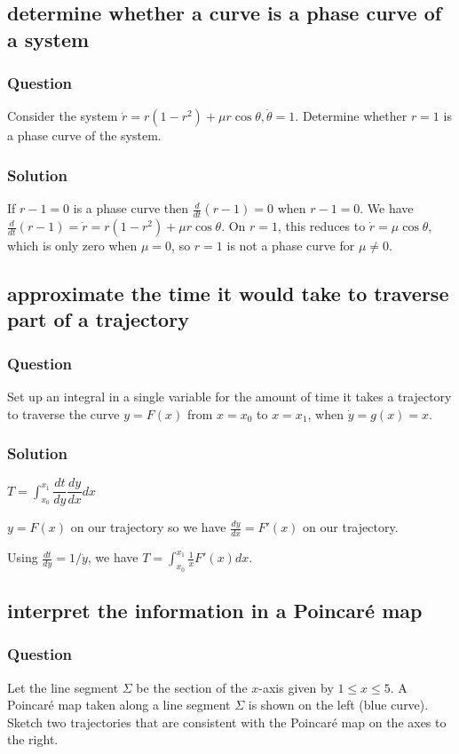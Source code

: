 \documentclass[12pt,letterpaper,noanswers]{exam}
\begin{document}
\subsection{determine whether a curve is a phase curve of a system}
\subsubsection{Question}
Consider the system $\dot r = r(1-r^2)+\mu r\cos\theta, \dot\theta = 1$.  Determine whether $r = 1$ is a phase curve of the system.

\subsubsection{Solution}
If $r-1 = 0$ is a phase curve then $\frac{d}{dt}(r-1) = 0$ when $r-1 = 0$.  We have $\frac{d}{dt}(r-1) = \dot r = r(1-r^2)+\mu r\cos\theta$.  On $r = 1$, this reduces to $\dot r = \mu\cos\theta$, which is only zero when $\mu = 0$, so $r=1$ is not a phase curve for $\mu\neq 0$.


\subsection{approximate the time it would take to traverse part of a trajectory}
\subsubsection{Question}
Set up an integral in a single variable for the amount of time it takes a trajectory to traverse the curve $y = F(x)$ from $x = x_0$ to $x = x_1$, when $\dot y = g(x) = x$.

\subsubsection{Solution}

$\displaystyle T = \int_{x_0}^{x_1} \dfrac{dt}{dy}\dfrac{dy}{dx}dx$ 

$y = F(x)$ on our trajectory so we have $\frac{dy}{dx} = F'(x)$ on our trajectory.

Using $\frac{dt}{dy} = 1/\dot y$, we have
$\displaystyle T = \int_{x_0}^{x_1} \frac{1}{x}F'(x)dx$.

\subsection{interpret the information in a Poincar\'e map}
\subsubsection{Question}
Let the line segment $\Sigma$ be the section of the $x$-axis given by $1\leq x \leq 5$.  A Poincar\'e map taken along a line segment $\Sigma$ is shown on the left (blue curve).  Sketch two trajectories that are consistent with the Poincar\'e map on the axes to the right. 
\end{document}
